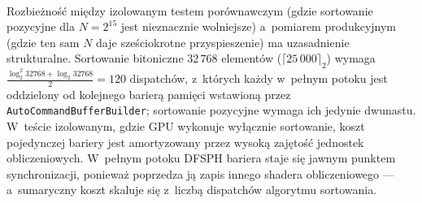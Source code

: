 \begin{table}[htbp]
\centering
\caption{Profil wydajności dla wariantu z~sortowaniem pozycyjnym ($N=25\,000$ cząstek)}
\label{tab:tracy_radix}
\vspace{1ex} \\
\end{table}

Rozbieżność między izolowanym testem porównawczym (gdzie sortowanie pozycyjne dla $N = 2^{15}$ jest
nieznacznie wolniejsze) a~pomiarem produkcyjnym (gdzie ten sam $N$ daje
sześciokrotne przyspieszenie) ma uzasadnienie strukturalne. Sortowanie
bitoniczne $32\,768$ elementów ($\lceil 25\,000 \rceil_2$) wymaga
$\frac{\log_2^2 32768 + \log_2 32768}{2} = 120$ dispatchów, z~których każdy
w~pełnym potoku jest oddzielony od kolejnego barierą pamięci wstawioną przez
\texttt{AutoCommandBufferBuilder}; sortowanie pozycyjne wymaga ich jedynie dwunastu. W~teście
izolowanym, gdzie GPU wykonuje wyłącznie sortowanie, koszt pojedynczej bariery
jest amortyzowany przez wysoką zajętość jednostek obliczeniowych. W~pełnym
potoku DFSPH bariera staje się jawnym punktem synchronizacji, ponieważ
poprzedza ją zapis innego shadera obliczeniowego --- a~sumaryczny koszt skaluje
się z~liczbą dispatchów algorytmu sortowania.

